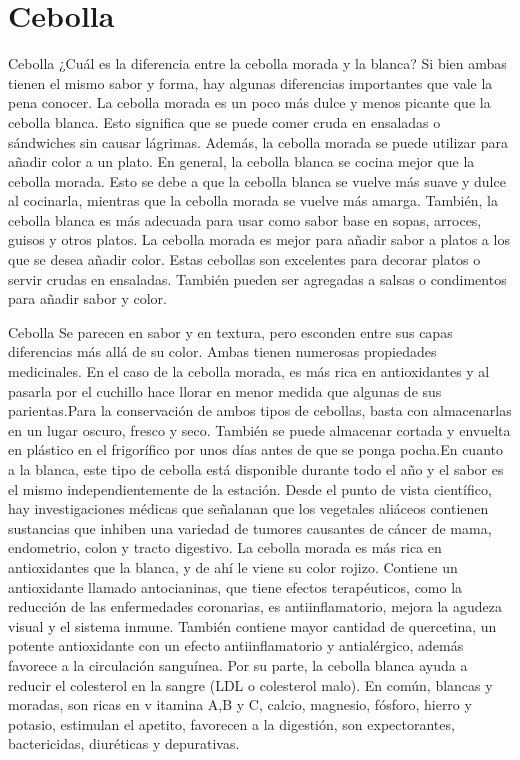 \documentclass[11pt]{beamer}
\begin{document}
    \section{Cebolla}
	    \begin{frame}{Cebolla}
		¿Cuál es la diferencia entre la cebolla morada y la blanca? Si bien ambas tienen el mismo sabor y forma, hay algunas diferencias importantes que vale la pena conocer. La cebolla morada es un poco más dulce y menos picante que la cebolla blanca. Esto significa que se puede comer cruda en ensaladas o sándwiches sin causar lágrimas. Además, la cebolla morada se puede utilizar para añadir color a un plato.
		En general, la cebolla blanca se cocina mejor que la cebolla morada. Esto se debe a que la cebolla blanca se vuelve más suave y dulce al cocinarla, mientras que la cebolla morada se vuelve más amarga. También, la cebolla blanca es más adecuada para usar como sabor base en sopas, arroces, guisos y otros platos.
		La cebolla morada es mejor para añadir sabor a platos a los que se desea añadir color. Estas cebollas son excelentes para decorar platos o servir crudas en ensaladas. También pueden ser agregadas a salsas o condimentos para añadir sabor y color.
	    \end{frame}
    
      	\begin{frame}{Cebolla}
		Se parecen en sabor y en textura, pero esconden entre sus capas diferencias más allá de su color. Ambas tienen numerosas propiedades medicinales. En el caso de la cebolla morada, es más rica en antioxidantes y al pasarla por el cuchillo hace llorar en menor medida que algunas de sus parientas.Para la conservación de ambos tipos de cebollas, basta con almacenarlas en un lugar oscuro, fresco y seco. También se puede almacenar cortada y envuelta en plástico en el frigorífico por unos días antes de que se ponga pocha.En cuanto a la blanca, este tipo de cebolla está disponible durante todo el año y el sabor es el mismo independientemente de la estación.
		Desde el punto de vista científico, hay investigaciones médicas que señalanan que los vegetales aliáceos contienen sustancias que inhiben una variedad de tumores causantes de cáncer de mama, endometrio, colon y tracto digestivo.
	    La cebolla morada es más rica en antioxidantes que la blanca, y de ahí le viene su color rojizo. Contiene un antioxidante llamado antocianinas, que tiene efectos terapéuticos, como la reducción de las enfermedades coronarias, es antiinflamatorio, mejora la agudeza visual y el sistema inmune.
		También contiene mayor cantidad de quercetina, un potente antioxidante con un efecto antiinflamatorio y antialérgico, además favorece a la circulación sanguínea.
		Por su parte, la cebolla blanca ayuda a reducir el colesterol en la sangre (LDL o colesterol malo).
		En común, blancas y moradas, son ricas en v itamina A,B y C, calcio, magnesio, fósforo, hierro y potasio, estimulan el apetito, favorecen a la digestión, son expectorantes, bactericidas, diuréticas y depurativas.
		\end{frame}
	
	
\end{document}

